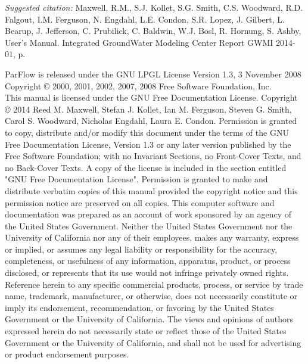 
\begin{CopyrightPage}
{\em Suggested citation: }Maxwell, R.M., S.J. Kollet, S.G. Smith, C.S. Woodward, R.D. Falgout, I.M. Ferguson, N. Engdahl, L.E. Condon, S.R. Lopez, J. Gilbert, L. Bearup, J. Jefferson, C. Prubilick, C. Baldwin, W.J. Bosl, R. Hornung, S. Ashby, \parflow{} User's Manual. Integrated GroundWater Modeling Center Report GWMI 2014-01, \pageref{end}p.\newline

{ \scriptsize
\noindent ParFlow is released under the GNU LPGL License \newline
\noindent Version 1.3, 3 November 2008 \newline
\noindent Copyright \copyright{} 2000, 2001, 2002, 2007, 2008  Free Software Foundation, Inc.\newline
{}\\
This manual is licensed under the GNU Free Documentation License.\newline\vspace{1em}
Copyright \copyright{} 2014  Reed M. Maxwell, Stefan J. Kollet, Ian M. Ferguson, Steven G. Smith, Carol S. Woodward, Nicholas Engdahl, Laura E. Condon. 
Permission is granted to copy, distribute and/or modify this document
under the terms of the GNU Free Documentation License, Version 1.3
or any later version published by the Free Software Foundation; with no Invariant Sections, no Front-Cover Texts, and no Back-Cover Texts. A copy of the license is included in the section entitled "GNU Free Documentation License".
Permission is granted to make and distribute verbatim copies of this
manual provided the copyright notice and this permission notice are
preserved on all copies.\newline\vspace{0.1em}
This computer software and documentation was prepared as an account of
work sponsored by an agency of the United  States Government.  Neither
the United States Government nor the  University of California nor any
of their employees, makes any warranty, express or implied, or assumes
any legal liability  or responsibility for the accuracy, completeness,
or   usefulness of any   information,  apparatus, product, or  process
disclosed,   or represents that  its  use would not infringe privately
owned rights.  Reference  herein to any specific  commercial products,
process,   or service by   trade  name,  trademark,  manufacturer,  or
otherwise, does not  necessarily constitute or imply its  endorsement,
recommendation, or  favoring  by the  United  States Government or the
University of California.  The views and opinions of authors expressed
herein do not necessarily state or reflect those  of the United States
Government or the University of California, and shall  not be used for
advertising or product endorsement purposes.}
\end{CopyrightPage}

